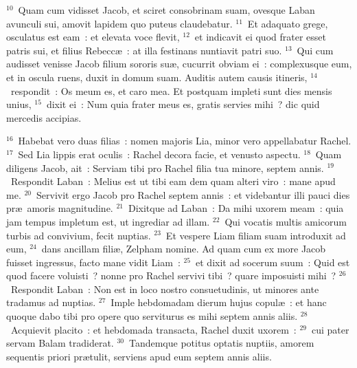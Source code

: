 ${}^{10}$~Quam cum vidisset Jacob, et sciret consobrinam suam, ovesque Laban avunculi sui, amovit lapidem quo puteus claudebatur.
${}^{11}$~Et adaquato grege, osculatus est eam~: et elevata voce flevit,
${}^{12}$~et indicavit ei quod frater esset patris sui, et filius Rebecc\ae~: at illa festinans nuntiavit patri suo.
${}^{13}$~Qui cum audisset venisse Jacob filium sororis su\ae , cucurrit obviam ei~: complexusque eum, et in oscula ruens, duxit in domum suam. Auditis autem causis itineris,
${}^{14}$~respondit~: Os meum es, et caro mea. Et postquam impleti sunt dies mensis unius,
${}^{15}$~dixit ei~: Num quia frater meus es, gratis servies mihi~? dic quid mercedis accipias.


${}^{16}$~Habebat vero duas filias~: nomen majoris Lia, minor vero appellabatur Rachel.
${}^{17}$~Sed Lia lippis erat oculis~: Rachel decora facie, et venusto aspectu.
${}^{18}$~Quam diligens Jacob, ait~: Serviam tibi pro Rachel filia tua minore, septem annis.
${}^{19}$~Respondit Laban~: Melius est ut tibi eam dem quam alteri viro~: mane apud me.
${}^{20}$~Servivit ergo Jacob pro Rachel septem annis~: et videbantur illi pauci dies pr\ae\ amoris magnitudine.
${}^{21}$~Dixitque ad Laban~: Da mihi uxorem meam~: quia jam tempus impletum est, ut ingrediar ad illam.
${}^{22}$~Qui vocatis multis amicorum turbis ad convivium, fecit nuptias.
${}^{23}$~Et vespere Liam filiam suam introduxit ad eum,
${}^{24}$~dans ancillam fili\ae , Zelpham nomine. Ad quam cum ex more Jacob fuisset ingressus, facto mane vidit Liam~:
${}^{25}$~et dixit ad socerum suum~: Quid est quod facere voluisti~? nonne pro Rachel servivi tibi~? quare imposuisti mihi~?
${}^{26}$~Respondit Laban~: Non est in loco nostro consuetudinis, ut minores ante tradamus ad nuptias.
${}^{27}$~Imple hebdomadam dierum hujus copul\ae~: et hanc quoque dabo tibi pro opere quo serviturus es mihi septem annis aliis.
${}^{28}$~Acquievit placito~: et hebdomada transacta, Rachel duxit uxorem~:
${}^{29}$~cui pater servam Balam tradiderat.
${}^{30}$~Tandemque potitus optatis nuptiis, amorem sequentis priori pr\ae tulit, serviens apud eum septem annis aliis.


